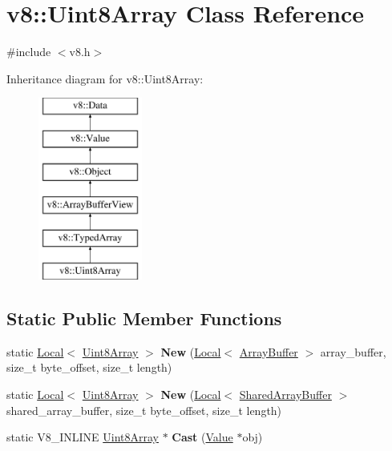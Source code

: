\hypertarget{classv8_1_1Uint8Array}{}\section{v8\+:\+:Uint8\+Array Class Reference}
\label{classv8_1_1Uint8Array}


{\ttfamily \#include $<$v8.\+h$>$}

Inheritance diagram for v8\+:\+:Uint8\+Array\+:\begin{figure}[H]
\begin{center}
\leavevmode
\includegraphics[height=6.000000cm]{classv8_1_1Uint8Array}
\end{center}
\end{figure}
\subsection*{Static Public Member Functions}
\begin{DoxyCompactItemize}
\item 
static \hyperlink{classv8_1_1Local}{Local}$<$ \hyperlink{classv8_1_1Uint8Array}{Uint8\+Array} $>$ {\bfseries New} (\hyperlink{classv8_1_1Local}{Local}$<$ \hyperlink{classv8_1_1ArrayBuffer}{Array\+Buffer} $>$ array\+\_\+buffer, size\+\_\+t byte\+\_\+offset, size\+\_\+t length)\hypertarget{classv8_1_1Uint8Array_a8262a637cc67c57669adcf5a18bcd29a}{}\label{classv8_1_1Uint8Array_a8262a637cc67c57669adcf5a18bcd29a}

\item 
static \hyperlink{classv8_1_1Local}{Local}$<$ \hyperlink{classv8_1_1Uint8Array}{Uint8\+Array} $>$ {\bfseries New} (\hyperlink{classv8_1_1Local}{Local}$<$ \hyperlink{classv8_1_1SharedArrayBuffer}{Shared\+Array\+Buffer} $>$ shared\+\_\+array\+\_\+buffer, size\+\_\+t byte\+\_\+offset, size\+\_\+t length)\hypertarget{classv8_1_1Uint8Array_a07d1f8e3377ddb6af3b423ed0d0f5d26}{}\label{classv8_1_1Uint8Array_a07d1f8e3377ddb6af3b423ed0d0f5d26}

\item 
static V8\+\_\+\+I\+N\+L\+I\+NE \hyperlink{classv8_1_1Uint8Array}{Uint8\+Array} $\ast$ {\bfseries Cast} (\hyperlink{classv8_1_1Value}{Value} $\ast$obj)\hypertarget{classv8_1_1Uint8Array_a3bf7e458abe0be9bc943ba2de6c4f432}{}\label{classv8_1_1Uint8Array_a3bf7e458abe0be9bc943ba2de6c4f432}

\end{DoxyCompactItemize}

